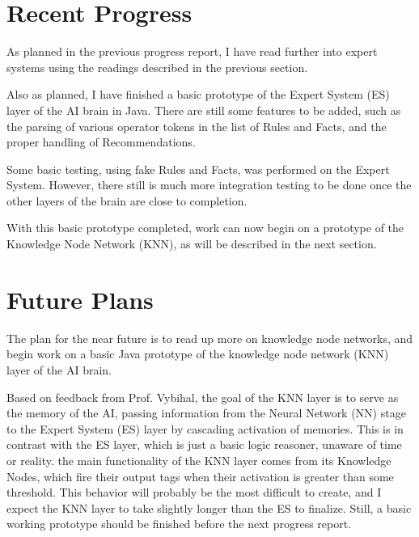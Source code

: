 \documentclass[]{article}
\begin{document}
\section{Recent Progress}

As planned in the previous progress report, I have read further into expert systems using the readings described in the previous section.

Also as planned, I have finished a basic prototype of the Expert System (ES) layer of the AI brain in Java. There are still some features to be added, such as the parsing of various operator tokens in the list of Rules and Facts, and the proper handling of Recommendations.

Some basic testing, using fake Rules and Facts, was performed on the Expert System. However, there still is much more integration testing to be done once the other layers of the brain are close to completion.

With this basic prototype completed, work can now begin on a prototype of the Knowledge Node Network (KNN), as will be described in the next section.

\section{Future Plans}

The plan for the near future is to read up more on knowledge node networks, and begin work on a basic Java prototype of the knowledge node network (KNN) layer of the AI brain.

Based on feedback from Prof. Vybihal, the goal of the KNN layer is to serve as the memory of the AI, passing information from the Neural Network (NN) stage to the Expert System (ES) layer by cascading activation of memories. This is in contrast with the ES layer, which is just a basic logic reasoner, unaware of time or reality. the main functionality of the KNN layer comes from its Knowledge Nodes, which fire their output tags when their activation is greater than some threshold. This behavior will probably be the most difficult to create, and I expect the KNN layer to take slightly longer than the ES to finalize. Still, a basic working prototype should be finished before the next progress report.


{}
\end{document}
